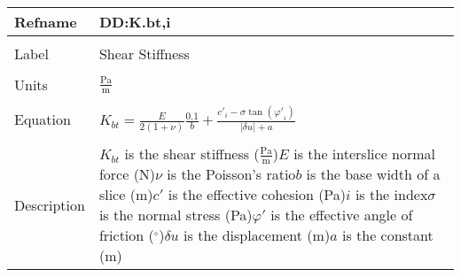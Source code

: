 \documentclass[12pt]{article}
\begin{document}
\noindent \begin{minipage}{\textwidth}
\begin{tabular}{p{} p{}}
\toprule \textbf{Refname} & \textbf{DD:K.bt,i}
\label{DD:K.bt,i}
\\ \midrule \\
Label & Shear Stiffness
\\ \midrule \\
Units & $\frac{\text{Pa}}{\text{m}}$
\\ \midrule \\
Equation & ${K_{bt}}=\frac{E}{2 \left(1+ν\right)} \frac{0.1}{b}+\frac{{c'}_{i}-σ \tan\left({φ'}_{i}\right)}{|δu|+a}$
\\ \midrule \\
Description & ${K_{bt}}$ is the shear stiffness ($\frac{\text{Pa}}{\text{m}}$)\newline$E$ is the interslice normal force (N)\newline$ν$ is the Poisson's ratio\newline$b$ is the base width of a slice (m)\newline$c'$ is the effective cohesion (Pa)\newline$i$ is the index\newline$σ$ is the normal stress (Pa)\newline$φ'$ is the effective angle of friction (${}^{\circ}$)\newline$δu$ is the displacement (m)\newline$a$ is the constant (m)
\\ \bottomrule \end{tabular}
\end{minipage}\\
~\newline
\end{document}

